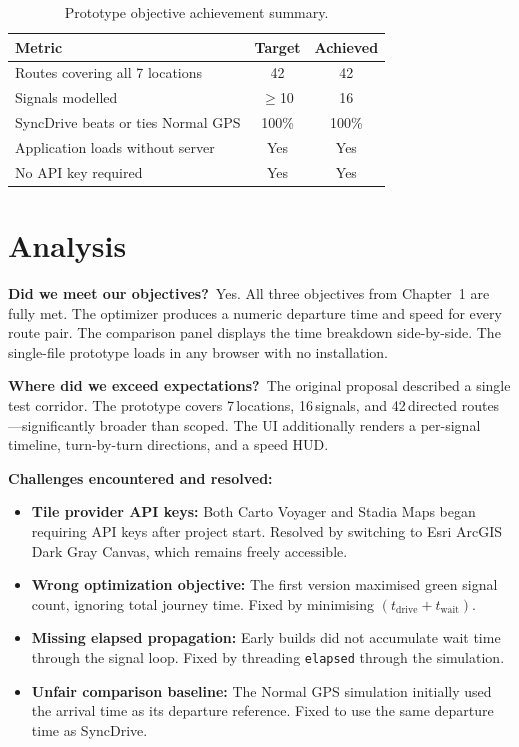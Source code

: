 \documentclass[12pt,a4paper]{report}
\begin{document}
\begin{table}[h]
\centering
\begin{tabular}{lcc}
\toprule
\textbf{Metric} & \textbf{Target} & \textbf{Achieved} \\
\midrule
Routes covering all 7 locations        & 42           & 42      \\
Signals modelled                        & $\geq$10     & 16      \\
SyncDrive beats or ties Normal GPS      & 100\%        & 100\%   \\
Application loads without server        & Yes          & Yes     \\
No API key required                     & Yes          & Yes     \\
\bottomrule
\end{tabular}
\caption{Prototype objective achievement summary.}
\end{table}

\section{Analysis}

\textbf{Did we meet our objectives?}\ Yes. All three objectives from
Chapter~1 are fully met. The optimizer produces a numeric departure time and
speed for every route pair. The comparison panel displays the time breakdown
side-by-side. The single-file prototype loads in any browser with no
installation.

\textbf{Where did we exceed expectations?}\ The original proposal described a
single test corridor. The prototype covers 7\,locations, 16\,signals, and
42\,directed routes---significantly broader than scoped. The UI additionally
renders a per-signal timeline, turn-by-turn directions, and a speed HUD.

\textbf{Challenges encountered and resolved:}

\begin{itemize}
  \item \textbf{Tile provider API keys:} Both Carto Voyager and Stadia Maps
        began requiring API keys after project start. Resolved by switching to
        Esri ArcGIS Dark Gray Canvas, which remains freely accessible.
  \item \textbf{Wrong optimization objective:} The first version maximised
        green signal count, ignoring total journey time. Fixed by minimising
        $(t_{\text{drive}} + t_{\text{wait}})$.
  \item \textbf{Missing elapsed propagation:} Early builds did not accumulate
        wait time through the signal loop. Fixed by threading
        \texttt{elapsed} through the simulation.
  \item \textbf{Unfair comparison baseline:} The Normal GPS simulation
        initially used the arrival time as its departure reference. Fixed to
        use the same departure time as SyncDrive.
\end{itemize}
\end{document}
